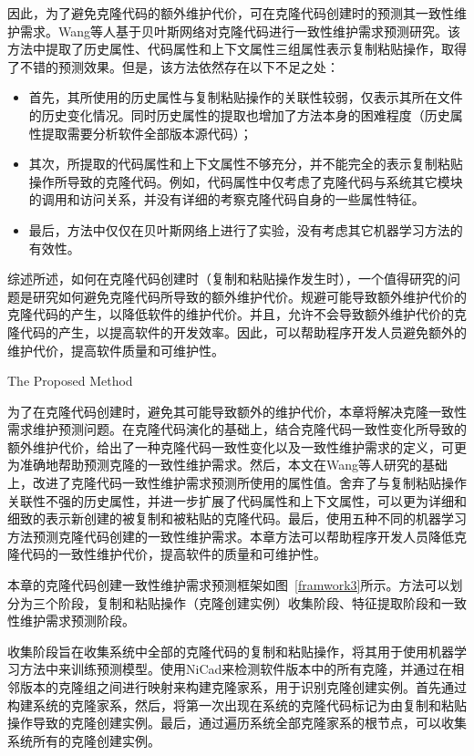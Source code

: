 因此，为了避免克隆代码的额外维护代价，可在克隆代码创建时的预测其一致性维护需求。Wang等人基于贝叶斯网络对克隆代码进行一致性维护需求预测研究\cite{wang2014predicting}。该方法中提取了历史属性、代码属性和上下文属性三组属性表示复制粘贴操作，取得了不错的预测效果。但是，该方法依然存在以下不足之处：

\begin{itemize}
\item
首先，其所使用的历史属性与复制粘贴操作的关联性较弱，仅表示其所在文件的历史变化情况。同时历史属性的提取也增加了方法本身的困难程度（历史属性提取需要分析软件全部版本源代码）；
\item
其次，所提取的代码属性和上下文属性不够充分，并不能完全的表示复制粘贴操作所导致的克隆代码。例如，代码属性中仅考虑了克隆代码与系统其它模块的调用和访问关系，并没有详细的考察克隆代码自身的一些属性特征。
\item
最后，方法中仅仅在贝叶斯网络上进行了实验，没有考虑其它机器学习方法的有效性。
\end{itemize}

综述所述，如何在克隆代码创建时（复制和粘贴操作发生时），一个值得研究的问题是研究如何避免克隆代码所导致的额外维护代价。规避可能导致额外维护代价的克隆代码的产生，以降低软件的维护代价。并且，允许不会导致额外维护代价的克隆代码的产生，以提高软件的开发效率。因此，可以帮助程序开发人员避免额外的维护代价，提高软件质量和可维护性。

{The Proposed Method}

为了在克隆代码创建时，避免其可能导致额外的维护代价，本章将解决克隆一致性需求维护预测问题。在克隆代码演化的基础上，结合克隆代码一致性变化所导致的额外维护代价，给出了一种克隆代码一致性变化以及一致性维护需求的定义，可更为准确地帮助预测克隆的一致性维护需求。然后，本文在Wang等人研究的基础上，改进了克隆代码一致性维护需求预测所使用的属性值。舍弃了与复制粘贴操作关联性不强的历史属性，并进一步扩展了代码属性和上下文属性，可以更为详细和细致的表示新创建的被复制和被粘贴的克隆代码。最后，使用五种不同的机器学习方法预测克隆代码创建的一致性维护需求。本章方法可以帮助程序开发人员降低克隆代码的一致性维护代价，提高软件的质量和可维护性。

本章的克隆代码创建一致性维护需求预测框架如图~\ref{framwork3}所示。方法可以划分为三个阶段，复制和粘贴操作（克隆创建实例）收集阶段、特征提取阶段和一致性维护需求预测阶段。

收集阶段旨在收集系统中全部的克隆代码的复制和粘贴操作，将其用于使用机器学习方法中来训练预测模型。使用NiCad来检测软件版本中的所有克隆，并通过在相邻版本的克隆组之间进行映射来构建克隆家系，用于识别克隆创建实例。首先通过构建系统的克隆家系，然后，将第一次出现在系统的克隆代码标记为由复制和粘贴操作导致的克隆创建实例。最后，通过遍历系统全部克隆家系的根节点，可以收集系统所有的克隆创建实例。

